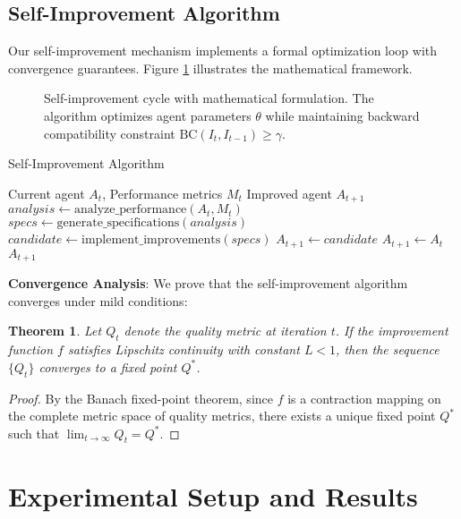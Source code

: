 \documentclass[10pt]{article}
\newtheorem{theorem}{Theorem}
\begin{document}
\subsection{Self-Improvement Algorithm}

Our self-improvement mechanism implements a formal optimization loop with convergence guarantees. Figure \ref{fig:self_improvement} illustrates the mathematical framework.

\begin{figure}[H]
\centering

\caption{Self-improvement cycle with mathematical formulation. The algorithm optimizes agent parameters $\theta$ while maintaining backward compatibility constraint $\text{BC}(I_t, I_{t-1}) \geq \gamma$.}
\label{fig:self_improvement}
\end{figure}

\begin{algorithm}[H]
\small
\caption{Self-Improvement Algorithm}
\begin{algorithmic}[1]
\REQUIRE Current agent $A_t$, Performance metrics $M_t$
\ENSURE Improved agent $A_{t+1}$
\STATE $analysis \leftarrow \text{analyze\_performance}(A_t, M_t)$
\STATE $specs \leftarrow \text{generate\_specifications}(analysis)$
\STATE $candidate \leftarrow \text{implement\_improvements}(specs)$
    \STATE $A_{t+1} \leftarrow candidate$
\ELSE
    \STATE $A_{t+1} \leftarrow A_t$
\ENDIF
\RETURN $A_{t+1}$
\end{algorithmic}
\end{algorithm}

\textbf{Convergence Analysis}: We prove that the self-improvement algorithm converges under mild conditions:

\begin{theorem}
Let $Q_t$ denote the quality metric at iteration $t$. If the improvement function $f$ satisfies Lipschitz continuity with constant $L < 1$, then the sequence $\{Q_t\}$ converges to a fixed point $Q^*$.
\end{theorem}

\begin{proof}
By the Banach fixed-point theorem, since $f$ is a contraction mapping on the complete metric space of quality metrics, there exists a unique fixed point $Q^*$ such that $\lim_{t \rightarrow \infty} Q_t = Q^*$.
\end{proof}

\section{Experimental Setup and Results}
\end{document}
